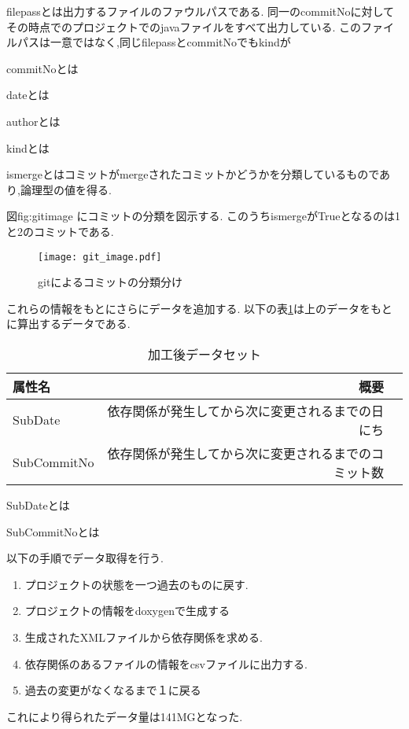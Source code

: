 \documentclass[submit,ses,noauthor]{ipsj} %
\begin{document}
filepassとは出力するファイルのファウルパスである.
同一のcommitNoに対してその時点でのプロジェクトでのjavaファイルをすべて出力している.
このファイルパスは一意ではなく,同じfilepassとcommitNoでもkindが

commitNoとは

dateとは

authorとは

kindとは

ismergeとはコミットがmergeされたコミットかどうかを分類しているものであり,論理型の値を得る.

図{fig:gitimage} にコミットの分類を図示する.
このうちismergeがTrueとなるのは1と2のコミットである.

\begin{figure*}[t]
\centering
\texttt{[image: git\_image.pdf]}
\caption{gitによるコミットの分類分け}
\label{fig:gitimage} 
\end{figure*}




これらの情報をもとにさらにデータを追加する.
以下の表\ref{tab:加工後データセット}は上のデータをもとに算出するデータである.

\begin{table}[htb]
\caption{加工後データセット}
\begin{tabular}{|l|r|r|} \hline
属性名 & 概要 \\ \hline
SubDate & 依存関係が発生してから次に変更されるまでの日にち \\ \hline
SubCommitNo & 依存関係が発生してから次に変更されるまでのコミット数 \\ \hline
\end{tabular}
\label{tab:加工後データセット}
\end{table}

SubDateとは

SubCommitNoとは


以下の手順でデータ取得を行う.
\begin{enumerate}
\item プロジェクトの状態を一つ過去のものに戻す.
\item プロジェクトの情報をdoxygenで生成する
\item 生成されたXMLファイルから依存関係を求める.
\item 依存関係のあるファイルの情報をcsvファイルに出力する.
\item 過去の変更がなくなるまで１に戻る
\end{enumerate}

これにより得られたデータ量は141MGとなった.
\end{document}

